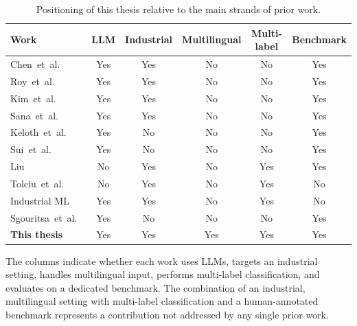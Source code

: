 \begin{table}[H]
    \centering
    \small
    \caption{Positioning of this thesis relative to the main strands of prior work.}
    \label{tab:rw-gap}
    \begin{tabular}{lccccc}
        \hline
        \textbf{Work} & \textbf{LLM} & \textbf{Industrial} & \textbf{Multilingual}
                      & \textbf{Multi-label} & \textbf{Benchmark} \\
        \hline
        Chen~et~al.~\cite{chen2024automatic}      & Yes & Yes & No  & No  & Yes \\
        Roy~et~al.~\cite{roy2024exploring}        & Yes & Yes & No  & No  & Yes \\
        Kim~et~al.~\cite{kim2026why}              & Yes & Yes & No  & No  & Yes \\
        Sana~et~al.~\cite{sana2025reasoning}      & Yes & Yes & No  & No  & Yes \\
        Keloth~et~al.~\cite{keloth2024advancing}  & Yes & No  & No  & No  & Yes \\
        Sui~et~al.~\cite{sui2024table}            & Yes & No  & No  & No  & Yes \\
        Liu~\cite{liu2023ticketbert}              & No  & Yes & No  & Yes & Yes \\
        Tolciu~et~al.~\cite{tolciu2021analysis}   & No  & Yes & No  & Yes & No  \\
        Industrial ML~\cite{llm4industrial2024}   & Yes & Yes & No  & Yes & No  \\
        Sgouritsa~et~al.~\cite{sgouritsa2024prompting} & Yes & No & No & No & Yes \\
        \textbf{This thesis}                      & Yes & Yes & Yes & Yes & Yes \\
        \hline
    \end{tabular}
\end{table}

\noindent
The columns indicate whether each work uses LLMs, targets an industrial setting,
handles multilingual input, performs multi-label classification, and evaluates
on a dedicated benchmark.  The combination of an industrial, multilingual
setting with multi-label classification and a human-annotated benchmark
represents a contribution not addressed by any single prior work.
